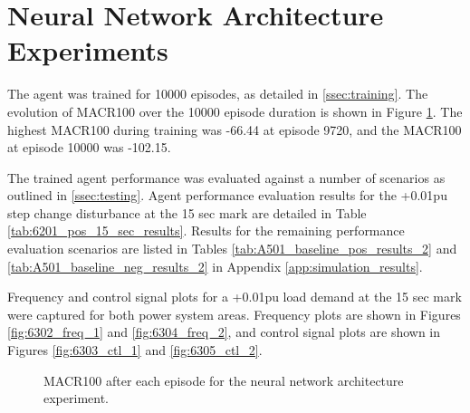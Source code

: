 \section{Neural Network Architecture Experiments}
The agent was trained for 10000 episodes, as detailed in \textsection \ref{ssec:training}. The evolution of MACR100 over the 10000 episode duration is shown in Figure \ref{fig:6301_average_reward}. The highest MACR100 during training was -66.44 at episode 9720, and the MACR100 at episode 10000 was -102.15.

The trained agent performance was evaluated against a number of scenarios as outlined in \textsection \ref{ssec:testing}. Agent performance evaluation results for the +0.01pu step change disturbance at the 15 sec mark are detailed in Table \ref{tab:6201_pos_15_sec_results}. Results for the remaining performance evaluation scenarios are listed in Tables \ref{tab:A501_baseline_pos_results_2} and \ref{tab:A501_baseline_neg_results_2} in Appendix \ref{app:simulation_results}.

Frequency and control signal plots for a +0.01pu load demand at the 15 sec mark were captured for both power system areas. Frequency plots are shown in Figures \ref{fig:6302_freq_1} and \ref{fig:6304_freq_2}, and control signal plots are shown in Figures \ref{fig:6303_ctl_1} and \ref{fig:6305_ctl_2}.

\begin{figure}[h]
	\centering
	
	\caption{MACR100 after each episode for the neural network architecture experiment.}\label{fig:6301_average_reward}
\end{figure}



